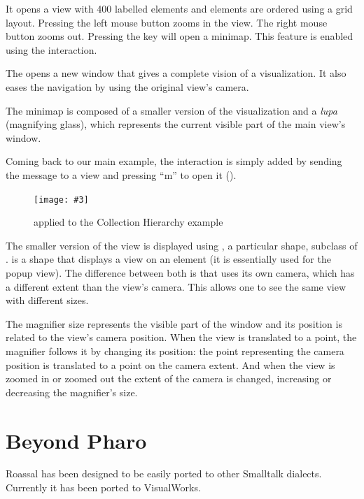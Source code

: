 \documentclass[a4paper,10pt,twoside]{book}
\newcommand{\fig}[4]{
		\begin{figure}[#1]
			\centering
			\texttt{[image: \#3]}
			\caption{\label{fig:#3}#4}
		\end{figure}}
\begin{document}
It opens a view with 400 labelled elements and elements are ordered using a grid layout. Pressing the left mouse button zooms in the view. The right mouse button zooms out. Pressing the  key will open a minimap. This feature is enabled using the  interaction.

The  opens a new window that gives a complete vision of a visualization. It also eases the navigation by using the original view's camera.

The minimap is composed of a smaller version of the visualization and a \emph{lupa} (magnifying glass), which represents the current visible part of the main view's window. 


Coming back to our main example, the interaction is simply added by sending the  message to a view and pressing ``m'' to open it (). %

\fig{H}{0.9}{miniMap}{ applied to the Collection Hierarchy example}

The smaller version of the view is displayed using , a particular shape, subclass of .   is a shape that displays a view on an element (it is essentially used for the popup view). The difference between both is that  uses its own camera, which has a different extent than the view's camera. This allows one to see the same view with different sizes. 

The magnifier size represents the visible part of the window and its position is related to the view's camera position. When the view is translated to a point, the magnifier follows it by changing its position: the point representing the camera position is translated to a point on the  camera extent. And when the view is zoomed in or zoomed out the extent of the camera is changed, increasing or decreasing the magnifier's size.


\section{Beyond Pharo}

Roassal has been designed to be easily ported to other Smalltalk dialects. Currently it has been ported to VisualWorks.
\end{document}
